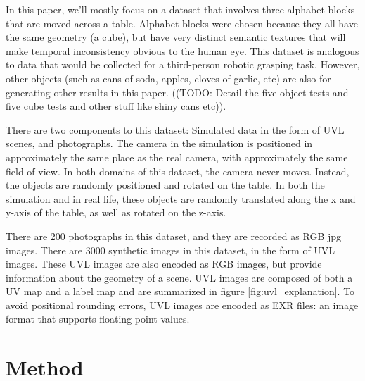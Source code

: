 \documentclass{article}
\begin{document}
In this paper, we'll mostly focus on a dataset that involves three alphabet blocks that are moved across a table.
Alphabet blocks were chosen because they all have the same geometry (a cube), but have very distinct semantic textures that will make temporal inconsistency obvious to the human eye.
This dataset is analogous to data that would be collected for a third-person robotic grasping task.
However, other objects (such as cans of soda, apples, cloves of garlic, etc) are also for generating other results in this paper. ((TODO: Detail the five object tests and five cube tests and other stuff like shiny cans etc)).

There are two components to this dataset: Simulated data in the form of UVL scenes, and photographs.
The camera in the simulation is positioned in approximately the same place as the real camera, with approximately the same field of view.
In both domains of this dataset, the camera never moves. Instead, the objects are randomly positioned and rotated on the table.
In both the simulation and in real life, these objects are randomly translated along the x and y-axis of the table, as well as rotated on the z-axis.

There are 200 photographs in this dataset, and they are recorded as RGB jpg images.
There are 3000 synthetic images in this dataset, in the form of UVL images.
These UVL images are also encoded as RGB images, but provide information about the geometry of a scene.
UVL images are composed of both a UV map and a label map and are summarized in figure \ref{fig:uvl_explanation}.
To avoid positional rounding errors, UVL images are encoded as EXR files: an image format that supports floating-point values.


\section{Method}
\label{sec:text}
\end{document}
